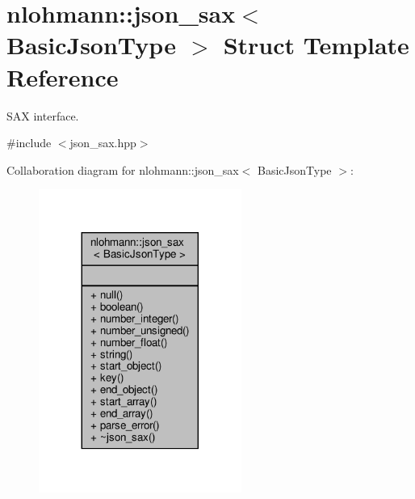 \hypertarget{structnlohmann_1_1json__sax}{}\section{nlohmann\+:\+:json\+\_\+sax$<$ Basic\+Json\+Type $>$ Struct Template Reference}
\label{structnlohmann_1_1json__sax}


S\+AX interface.  




{\ttfamily \#include $<$json\+\_\+sax.\+hpp$>$}



Collaboration diagram for nlohmann\+:\+:json\+\_\+sax$<$ Basic\+Json\+Type $>$\+:\nopagebreak
\begin{figure}[H]
\begin{center}
\leavevmode
\includegraphics[width=188pt]{structnlohmann_1_1json__sax__coll__graph}
\end{center}
\end{figure}
